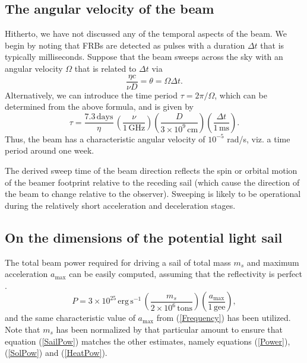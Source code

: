 \documentclass[twocolumn,tighten]{aastex61}
\begin{document}
\subsection{The angular velocity of the beam}
Hitherto, we have not discussed any of the temporal aspects of the beam. We begin by noting that FRBs are detected as pulses with a duration $\Delta t$ that is typically milliseconds. Suppose that the beam sweeps across the sky with an angular velocity $\Omega$ that is related to $\Delta t$ \citep{BB16} via
\begin{equation}
\frac{\eta c}{\nu D} = \theta = \Omega \Delta t.
\end{equation}
Alternatively, we can introduce the time period $\tau = 2\pi/\Omega$, which can be determined from the above formula, and is given by
\begin{equation}
\tau = \frac{7.3\,\mathrm{days}}{\eta}\, \left(\frac{\nu}{1\,\mathrm{GHz}}\right) \left(\frac{D}{3 \times 10^9\,\mathrm{cm}}\right) \left(\frac{\Delta t}{1\,\mathrm{ms}}\right).
\end{equation}
Thus, the beam has a characteristic angular velocity of $10^{-5}$ rad/s, viz. a time period around one week.

The derived sweep time of the beam direction reflects the spin or orbital motion of the beamer footprint relative to the receding sail (which cause the direction of the beam to change relative to the observer). Sweeping is likely to be operational during the relatively short acceleration and deceleration stages. 

\subsection{On the dimensions of the potential light sail}
The total beam power required for driving a sail of total mass $m_s$ and maximum acceleration $a_\mathrm{max}$ can be easily computed, assuming that the reflectivity is perfect \citep{Ben13,GL15}.
\begin{equation} \label{SailPow}
P = 3 \times 10^{25}\,\mathrm{erg\,s^{-1}}\,\left(\frac{m_s}{2\times10^{6}\,\mathrm{tons}}\right)\left(\frac{a_\mathrm{max}}{1\,\mathrm{gee}}\right),
\end{equation}
and the same characteristic value of $a_\mathrm{max}$ from (\ref{Frequency}) has been utilized. Note that $m_s$ has been normalized by that particular amount to ensure that equation (\ref{SailPow}) matches the other estimates, namely equations (\ref{Power}), (\ref{SolPow}) and (\ref{HeatPow}).
\end{document}
